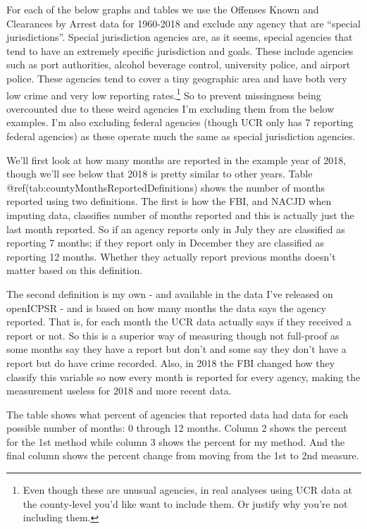 \documentclass[
  12pt,
  openany]{book}
\begin{document}
For each of the below graphs and tables we use the Offenses Known and Clearances by Arrest data for 1960-2018 and exclude any agency that are ``special jurisdictions''. Special jurisdiction agencies are, as it seems, special agencies that tend to have an extremely specific jurisdiction and goals. These include agencies such as port authorities, alcohol beverage control, university police, and airport police. These agencies tend to cover a tiny geographic area and have both very low crime and very low reporting rates.\footnote{Even though these are unusual agencies, in real analyses using UCR data at the county-level you'd like want to include them. Or justify why you're not including them.} So to prevent missingness being overcounted due to these weird agencies I'm excluding them from the below examples. I'm also excluding federal agencies (though UCR only has 7 reporting federal agencies) as these operate much the same as special jurisdiction agencies.

We'll first look at how many months are reported in the example year of 2018, though we'll see below that 2018 is pretty similar to other years. Table @ref(tab:countyMonthsReportedDefinitions) shows the number of months reported using two definitions. The first is how the FBI, and NACJD when imputing data, classifies number of months reported and this is actually just the last month reported. So if an agency reports only in July they are classified as reporting 7 months; if they report only in December they are classified as reporting 12 months. Whether they actually report previous months doesn't matter based on this definition.

The second definition is my own - and available in the data I've released on openICPSR - and is based on how many months the data says the agency reported. That is, for each month the UCR data actually says if they received a report or not. So this is a superior way of measuring though not full-proof as some months say they have a report but don't and some say they don't have a report but do have crime recorded. Also, in 2018 the FBI changed how they classify this variable so now every month is reported for every agency, making the measurement useless for 2018 and more recent data.

The table shows what percent of agencies that reported data had data for each possible number of months: 0 through 12 months. Column 2 shows the percent for the 1st method while column 3 shows the percent for my method. And the final column shows the percent change from moving from the 1st to 2nd measure.
\end{document}
